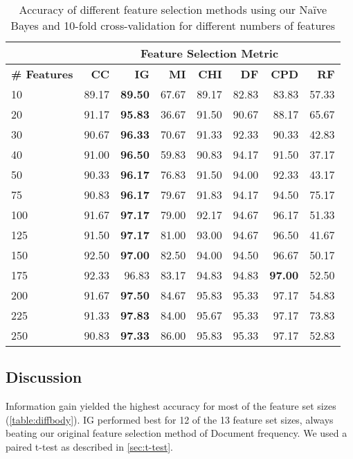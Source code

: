 \documentclass[10pt, a4paper]{article}
\begin{document}
\begin{table}[H]
\centering
\caption{Accuracy of different feature selection methods using our Na\"ive Bayes and 10-fold cross-validation for different numbers of features}
\begin{tabular}{@{}l rrrrrrr@{}}
\toprule
& \multicolumn{7}{c}{\textbf{Feature Selection Metric}}\\
\midrule
\textbf{\# Features} & \textbf{CC} & \textbf{IG} & \textbf{MI} & \textbf{CHI} & \textbf{DF} & \textbf{CPD} & \textbf{RF} \\
\midrule
10 & 89.17 & \textbf{89.50} & 67.67 & 89.17 & 82.83 & 83.83 & 57.33 \\
20 & 91.17 & \textbf{95.83} & 36.67 & 91.50 & 90.67 & 88.17 & 65.67 \\
30 & 90.67 & \textbf{96.33} & 70.67 & 91.33 & 92.33 & 90.33 & 42.83 \\
40 & 91.00 & \textbf{96.50} & 59.83 & 90.83 & 94.17 & 91.50 & 37.17 \\
50 & 90.33 & \textbf{96.17} & 76.83 & 91.50 & 94.00 & 92.33 & 43.17 \\
75 & 90.83 & \textbf{96.17} & 79.67 & 91.83 & 94.17 & 94.50 & 75.17 \\
100 & 91.67 & \textbf{97.17} & 79.00 & 92.17 & 94.67 & 96.17 & 51.33 \\
125 & 91.50 & \textbf{97.17} & 81.00 & 93.00 & 94.67 & 96.50 & 41.67 \\
150 & 92.50 & \textbf{97.00} & 82.50 & 94.00 & 94.50 & 96.67 & 50.17 \\
175 & 92.33 & 96.83 & 83.17 & 94.83 & 94.83 & \textbf{97.00} & 52.50 \\
200 & 91.67 & \textbf{97.50} & 84.67 & 95.83 & 95.33 & 97.17 & 54.83 \\
225 & 91.33 & \textbf{97.83} & 84.00 & 95.67 & 95.33 & 97.17 & 73.83 \\
250 & 90.83 & \textbf{97.33} & 86.00 & 95.83 & 95.33 & 97.17 & 52.83 \\
\bottomrule
\end{tabular}
\label{table:diffbody}
\end{table}

\subsection{Discussion}


Information gain yielded the highest accuracy for most of the feature set sizes (\autoref{table:diffbody}). IG performed best for 12 of the 13 feature set sizes, always beating our original feature selection method of Document frequency. We used a paired t-test as described in \ref{sec:t-test}.
\end{document}
